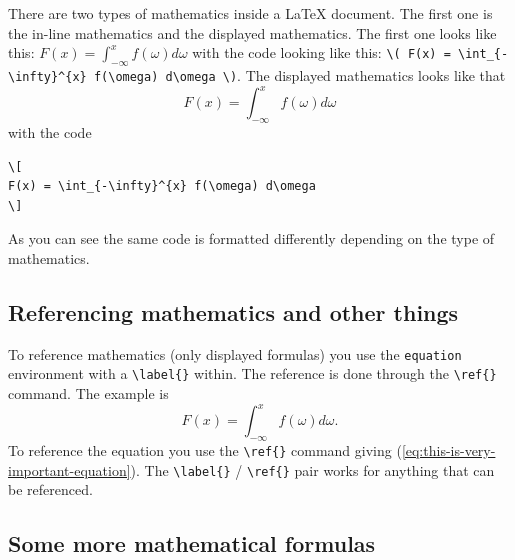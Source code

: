 \documentclass[english, twoside, 12pt, a4paper]{article}
\theoremstyle{definition}
\theoremstyle{plain}
\theoremstyle{remark}
\begin{document}
There are two types of mathematics inside a \LaTeX{} document. The first one is the in-line mathematics and the displayed mathematics. The first one looks like this: \( F(x) = \int_{-\infty}^{x} f(\omega) d\omega \) with the code looking like this: \verb!\( F(x) = \int_{-\infty}^{x} f(\omega) d\omega \)!. The displayed mathematics looks like that
\[
F(x) = \int_{-\infty}^{x} f(\omega) d\omega
\]
with the code
\begin{verbatim}
\[
F(x) = \int_{-\infty}^{x} f(\omega) d\omega
\]
\end{verbatim}
As you can see the same code is formatted differently depending on the type of mathematics.

\subsection{Referencing mathematics and other things}

To reference mathematics (only displayed formulas) you use the \verb+equation+ environment with a \verb+\label{}+ within. The reference is done through the \verb+\ref{}+ command. The example is
\begin{equation}
\label{eq:this-is-very-important-equation}
F(x) = \int_{-\infty}^{x} f(\omega) d\omega.
\end{equation}
To reference the equation you use the \verb+\ref{}+ command giving (\ref{eq:this-is-very-important-equation}). The \verb+\label{}+ / \verb+\ref{}+ pair works for anything that can be referenced.

\subsection{Some more mathematical formulas}
\end{document}
